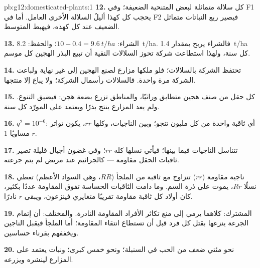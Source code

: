 \begin{solution}{pb:g12:domesticated-plants:1}
\textbf{12.} كل سلالة متماثلة  لبعض  المتنحية الضعيفة؛
وفي F1 يحجب كل  كهذا أليلُ السلالة الأخرى العامل. أما في F2 فيصير
ربع النباتات متماثل   الضعيف عند كل  كهذه، فيهبط
المتوسط.

\textbf{13.} الشراء: $10 - 0.4 = \qty{9.6}{t/ha}$؛ والحفظ: \qty{8.2}{t/ha}.
فالشراء يربح بمقدار \qty{1.4}{t/ha} كل سنة، ولهذا استطاعت شركة تحوز
السلالات النقية أن تبيع البذر الهجين كل موسم.

\textbf{14.} تحتفظ الشركة بالسلالات؛ فلو ملكها مزارع لصنع الهجين إلى
غير نهاية ولباعت الشركة مرة واحدة. فالسلالات رأسمال الشركة؛ ولا يباع
إلا منتجها.

\textbf{15.} كل حقل من صنف هجين متطابق وراثيًا، والمناطق تزرع بضعة
هجن: فيضيق التنوع. ولم يعد المزارع ينتج بذرًا ويعتمد على المورّد كل
سنة.

\textbf{16.} $q^2 = 10^{-6}$: أي ثاقبة واحدة من كل مليون تنجو؛ وبين
الناجيات، وكلها $rr$، يكون تواتر $r$ مساويًا 1.

\textbf{17.} تتناسل الناجيات فيما بينها؛ فيأتي نسلها كله $rr$؛ وفي
غضون أجيال قليلة تصير ثاقبات الحقل مقاومة --- كالجراثيم عند مريض لم
يتم جرعته.

\textbf{18.} ناجية مقاومة ($rr$) تتزاوج مع ثاقبة من الملجأ ($RR$، وهي
السواد الأعظم) تعطي نسلًا $Rr$، يموت على ذرة السم. وما دامت الثاقبات
الحساسة تفوق المقاومة عددًا بكثير، كان أولاد كل ثاقبة مقاومة تقريبًا
متغايري  فينزعون، ويبقى $r$ نادرًا.

\textbf{19.} المشترك: كلاهما يرمي إلى منع تكاثر الأفراد المقاومة
النادرة. والمختلف: أن إتمام الجرعة ينزعها بقتل كل فرد قبل أن تستطاع
انتقاء المقاومة؛ أما الملجأ فيقبل الناجين ويخففهم بقرناء حساسين.

\textbf{20.} نحو مئتي ضعف من الحب في السنبلة؛ ونحو خمس  كبرى؛
ونبات يعتمد على المزارع لينشره ويزرعه.
\end{solution}
